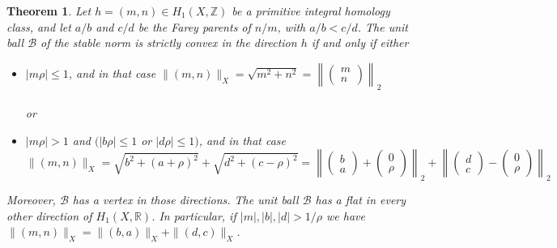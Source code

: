 \documentclass{article}
\newcommand{\RR}{\mathbb{R}}
\newcommand{\ZZ}{\mathbb{Z}}
\newcommand{\Bb}{\mathcal{B}}
\newcommand{\St}[1]{\|#1\|_X}
\newtheorem{thm}{Theorem}[section]
\theoremstyle{definition}
\begin{document}
\begin{thm}\label{main thm}
Let $h=(m,n)\in H_1(X,\ZZ)$ be a primitive integral homology class, and let $a/b$ and $c/d$ be the Farey parents of $n/m$, with $a/b<c/d$. The unit ball $\Bb$ of the stable norm is strictly convex in the direction $h$ if and only if either

\begin{itemize}\renewcommand{\labelitemi}{$\bullet$}
\item $|m\rho| \le 1$, and in that case $\St{(m,n)}=\sqrt{m^2+n^2} = \left\| \begin{pmatrix} m \\ n \end{pmatrix} \right \|_2$  \\ \\
or
\item $|m\rho| >1$ and $(|b\rho|\le 1$ or $|d\rho|\le 1)$, and in that case $$\St{(m,n)}=\sqrt{b^2+(a+\rho)^2}+\sqrt{d^2+(c-\rho)^2}= \left \|\begin{pmatrix} b \\ a \end{pmatrix} + \begin{pmatrix} 0 \\ \rho \end{pmatrix} \right \|_2 + \left \| \begin{pmatrix} d \\ c \end{pmatrix} - \begin{pmatrix} 0 \\\rho\end{pmatrix} \right \|_2$$ 
\end{itemize}
Moreover, $\Bb$ has a vertex in those directions.
The unit ball $\Bb$ has a flat in every other direction of $H_1(X,\RR)$. In particular, if $|m|,|b|,|d|> 1/\rho$ we have $\St{(m,n)}=\St{(b,a)}+\St{(d,c)}$.
\end{thm}
\end{document}
